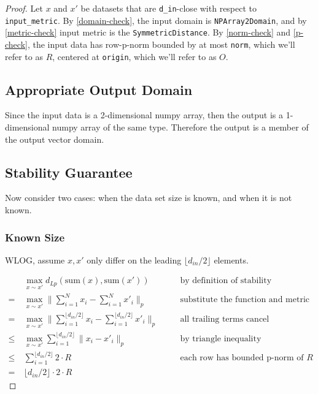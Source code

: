 \documentclass{article}
\begin{document}
\begin{proof} 

Let $x$ and $x'$ be datasets that are \texttt{d\_in}-close with respect to \texttt{input\_metric}.
By \ref{domain-check}, the input domain is \texttt{NPArray2Domain},
and by \ref{metric-check} input metric is the \texttt{SymmetricDistance}. 
By \ref{norm-check} and \ref{p-check}, the input data has row-p-norm bounded by at most \texttt{norm}, which we'll refer to as $R$,
centered at \texttt{origin}, which we'll refer to as $O$.

\subsection{Appropriate Output Domain}

Since the input data is a 2-dimensional numpy array, then the output is a 1-dimensional numpy array of the same type.
Therefore the output is a member of the output vector domain.

\subsection{Stability Guarantee}

Now consider two cases: when the data set size is known, and when it is not known.

\subsubsection{Known Size}
    WLOG, assume $x, x'$ only differ on the leading $\lfloor d_{in} / 2 \rfloor$ elements.

    \begin{align}
        & \ \max_{x \sim x'} d_{Lp}(\mathrm{sum}(x), \mathrm{sum}(x')) && \quad \text{by definition of stability}\\
        =&\ \max_{x \sim x'} \lVert\sum_{i = 1}^N x_i - \sum_{i = 1}^{N} x'_i \rVert_p && \quad \text{substitute the function and metric} \\
        =&\ \max_{x \sim x'} \lVert\sum_{i = 1}^{\lfloor d_{in} / 2 \rfloor} x_{i} - \sum_{i = 1}^{\lfloor d_{in} / 2 \rfloor} x'_{i}\rVert_p && \quad\text{all trailing terms cancel} \\
        \le&\ \max_{x \sim x'} \sum_{i = 1}^{\lfloor d_{in} / 2 \rfloor} \lVert x_i - x'_{i} \rVert_p && \quad \text{by triangle inequality} \\
        \le&\ \sum_{i = 1}^{\lfloor d_{in} / 2 \rfloor} 2 \cdot R && \quad\text{each row has bounded p-norm of } R \\
        =&\ \lfloor d_{in} / 2 \rfloor \cdot 2 \cdot R
    \end{align}


\end{proof}
\end{document}
